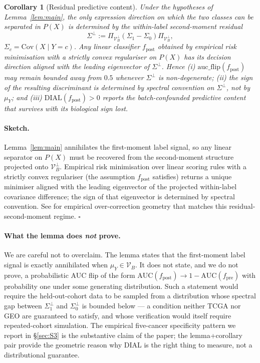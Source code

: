 \documentclass[11pt,a4paper]{article}
\newtheorem{corollary}{Corollary}
\begin{document}
\begin{corollary}[Residual predictive content]
\label{cor:main}
Under the hypotheses of Lemma~\ref{lem:main}, the only expression
direction on which the two classes can be separated in $P(X)$ is
determined by the within-label second-moment residual
\[
  \Sigma^\perp := \Pi_{\mathcal{V}_B^\perp}(\Sigma_1 - \Sigma_0)
  \Pi_{\mathcal{V}_B^\perp},
\]
$\Sigma_c = \mathrm{Cov}(X \mid Y = c)$. Any linear classifier
$f_{\mathrm{post}}$ obtained by empirical risk minimisation with a
strictly convex regulariser on $P(X)$ has its decision direction
aligned with the leading eigenvector of $\Sigma^\perp$. Hence (i)
$\mathrm{auc\_flip}(f_{\mathrm{post}})$ may remain bounded away from
$0.5$ whenever $\Sigma^\perp$ is non-degenerate; (ii) the sign of the
resulting discriminant is determined by spectral convention on
$\Sigma^\perp$, not by $\mu_Y$; and (iii)
$\mathrm{DIAL}(f_{\mathrm{post}}) > 0$ reports the batch-confounded
predictive content that survives with its biological sign lost.
\end{corollary}

\paragraph{Sketch.} Lemma~\ref{lem:main} annihilates the
first-moment label signal, so any linear separator on $P(X)$ must be
recovered from the second-moment structure projected onto
$\mathcal{V}_B^\perp$. Empirical risk minimisation over linear
scoring rules with a strictly convex regulariser (the assumption
$f_{\mathrm{post}}$ satisfies) returns a unique minimiser aligned
with the leading eigenvector of the projected within-label covariance
difference; the sign of that eigenvector is determined by spectral
convention. See \citep{leek2010sva, nygaard2016batch,
korsunsky2019harmony} for empirical over-correction geometry that
matches this residual-second-moment regime. $\square$

\paragraph{What the lemma does \emph{not} prove.} We are careful
not to overclaim. The lemma states that the first-moment label
signal is exactly annihilated when $\mu_Y \in \mathcal{V}_B$. It
does not state, and we do not prove, a probabilistic AUC flip of the
form $\mathrm{AUC}(f_{\mathrm{post}}) \to 1 -
\mathrm{AUC}(f_{\mathrm{pre}})$ with probability one under some
generating distribution. Such a statement would require the
held-out-cohort data to be sampled from a distribution whose
spectral gap between $\Sigma_1^\perp$ and $\Sigma_0^\perp$ is
bounded below --- a condition neither TCGA nor GEO are guaranteed to
satisfy, and whose verification would itself require repeated-cohort
simulation. The empirical five-cancer specificity pattern we report
in \S\ref{sec:S3} is the substantive claim of the paper; the
lemma+corollary pair provide the geometric reason why DIAL is the
right thing to measure, not a distributional guarantee.
\end{document}
